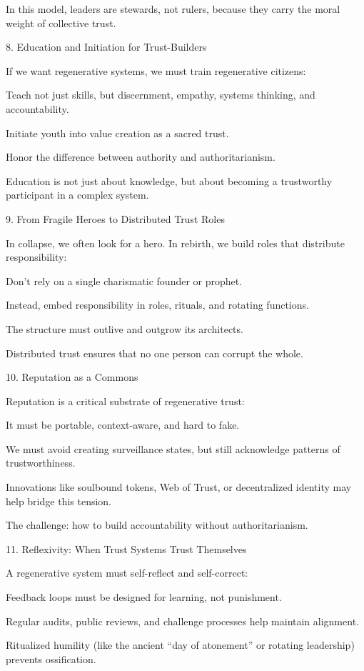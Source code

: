 \documentclass[11pt,oneside]{book}
\begin{document}
In this model, leaders are stewards, not rulers, because they carry the moral weight of collective trust.

8. Education and Initiation for Trust-Builders


If we want regenerative systems, we must train regenerative citizens:

    Teach not just skills, but discernment, empathy, systems thinking, and accountability.

    Initiate youth into value creation as a sacred trust.

    Honor the difference between authority and authoritarianism.

Education is not just about knowledge, but about becoming a trustworthy participant in a complex system.

9. From Fragile Heroes to Distributed Trust Roles


In collapse, we often look for a hero. In rebirth, we build roles that distribute responsibility:

    Don't rely on a single charismatic founder or prophet.

    Instead, embed responsibility in roles, rituals, and rotating functions.

    The structure must outlive and outgrow its architects.

Distributed trust ensures that no one person can corrupt the whole.

10. Reputation as a Commons


Reputation is a critical substrate of regenerative trust:

    It must be portable, context-aware, and hard to fake.

    We must avoid creating surveillance states, but still acknowledge patterns of trustworthiness.

    Innovations like soulbound tokens, Web of Trust, or decentralized identity may help bridge this tension.

The challenge: how to build accountability without authoritarianism.

11. Reflexivity: When Trust Systems Trust Themselves


A regenerative system must self-reflect and self-correct:

    Feedback loops must be designed for learning, not punishment.

    Regular audits, public reviews, and challenge processes help maintain alignment.

    Ritualized humility (like the ancient “day of atonement” or rotating leadership) prevents ossification.
\end{document}

